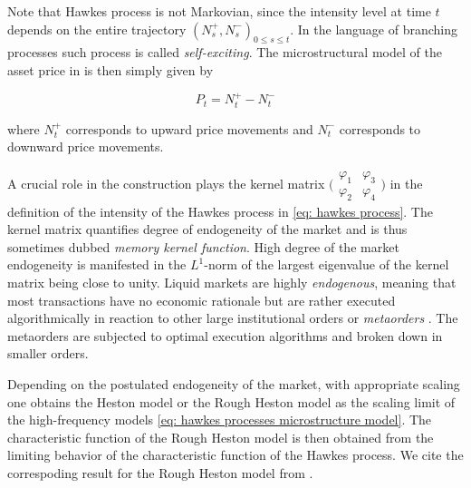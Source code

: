 \documentclass[12pt,twoside]{article}
\theoremstyle{plain}
\theoremstyle{plain}
\theoremstyle{definition}
\theoremstyle{remark}
\numberwithin{equation}{section}
\begin{document}
Note that Hawkes process is not Markovian, since the intensity level at time $t$ depends on the entire trajectory $\left(N_{s}^{+}, N_{s}^{-}\right)_{0 \leq s \leq t}$. In the language of branching processes such process is called \textit{self-exciting}. The microstructural model of the asset price in \cite{ER16} is then simply given by

\begin{equation}
\label{eq: hawkes processes microstructure model}
P_{t}=N_{t}^{+}-N_{t}^{-}
\end{equation}

where $N_{t}^{+}$ corresponds to upward price movements and $N_{t}^{-}$ corresponds to downward price movements.

A crucial role in the construction plays the kernel matrix $\big(\begin{smallmatrix}
\varphi_1 & \varphi_3 \\ \varphi_2 & \varphi_4
\end{smallmatrix}\big)$  in the definition of the intensity of the Hawkes process in \eqref{eq: hawkes process}. The kernel matrix quantifies degree of endogeneity of the market and is thus sometimes dubbed \emph{memory kernel function}. High degree of the market endogeneity is manifested in the $L^1$-norm of the largest eigenvalue of the kernel matrix being close to unity. Liquid markets are highly \emph{endogenous}, meaning that most transactions have no economic rationale but are rather executed algorithmically in reaction to other large institutional orders or \emph{metaorders} \cite{FS12}. The metaorders are subjected to optimal execution algorithms and broken down in smaller orders.

Depending on the postulated endogeneity of the market, with appropriate scaling one obtains the Heston model \cite{JR15} or the Rough Heston model \cite{ER16} as the scaling limit of the high-frequency models \eqref{eq: hawkes processes microstructure model}. The characteristic function of the Rough Heston model is then obtained from the limiting behavior of the characteristic function of the Hawkes process. We cite the correspoding result for the Rough Heston model from \cite{ER16}.
\end{document}
